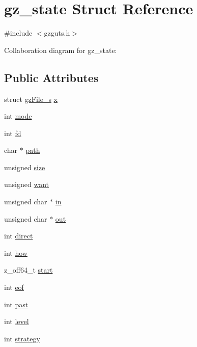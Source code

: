 \hypertarget{structgz__state}{}\section{gz\+\_\+state Struct Reference}
\label{structgz__state}


{\ttfamily \#include $<$gzguts.\+h$>$}



Collaboration diagram for gz\+\_\+state\+:
\subsection*{Public Attributes}
\begin{DoxyCompactItemize}
\item 
struct \hyperlink{structgzFile__s}{gz\+File\+\_\+s} \hyperlink{structgz__state_a92b9a7b77e0b6a494275d8bf0f0f3274}{x}
\item 
int \hyperlink{structgz__state_aaded3d8b2702b1bfabe3141e6f772b1a}{mode}
\item 
int \hyperlink{structgz__state_a5963abca9e640ff2aa40b517f9cffc2c}{fd}
\item 
char $\ast$ \hyperlink{structgz__state_ad52b106362f7262800d7224ff90fdd16}{path}
\item 
unsigned \hyperlink{structgz__state_a36b86ed64aca8f022ec0f3411663fe24}{size}
\item 
unsigned \hyperlink{structgz__state_abee992fb115f9f118377b9f46d14b2a5}{want}
\item 
unsigned char $\ast$ \hyperlink{structgz__state_af16c5730c48518809ead34557d612942}{in}
\item 
unsigned char $\ast$ \hyperlink{structgz__state_ad83d10502587255806fd712109867106}{out}
\item 
int \hyperlink{structgz__state_a114c6a0de43039853ead48a092792a7d}{direct}
\item 
int \hyperlink{structgz__state_ac6e4b7db699aacd089f6d55b01483d6f}{how}
\item 
z\+\_\+off64\+\_\+t \hyperlink{structgz__state_a0eb95c1935a32c508a1e6fc1e84c8f83}{start}
\item 
int \hyperlink{structgz__state_ae50ffc823858bc4f909e3d9507356f92}{eof}
\item 
int \hyperlink{structgz__state_a65b39b950d5cabf4c174924c922aa3ff}{past}
\item 
int \hyperlink{structgz__state_aaf5e13a32b8618cde112e4312d480137}{level}
\item 
int \hyperlink{structgz__state_a2777c46311012def486c2aa720fe5203}{strategy}

\end{DoxyCompactItemize}
